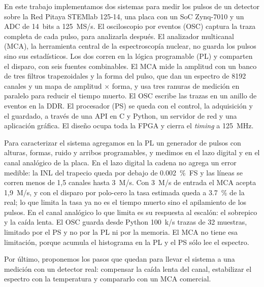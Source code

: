 \begin{resumen}%
En este trabajo implementamos dos sistemas para medir los pulsos de un detector
sobre la Red Pitaya STEMlab 125-14, una placa con un SoC Zynq-7010 y un ADC de
14~bits a 125~MS/s. El osciloscopio por eventos (OSC) captura la traza completa
de cada pulso, para analizarla después. El analizador multicanal (MCA), la
herramienta central de la espectroscopía nuclear, no guarda los pulsos sino sus
estadísticos. Los dos corren en la
lógica programable (PL) y comparten el disparo, con seis fuentes combinables.
El MCA mide la amplitud con un banco de tres filtros trapezoidales y la forma
del pulso, que dan un espectro de 8192 canales y un mapa de amplitud $\times$
forma, y usa tres ranuras de medición en paralelo para reducir el tiempo
muerto. El OSC escribe las trazas en un anillo de eventos en la DDR. El
procesador (PS) se queda con el control, la
adquisición y el guardado, a través de una API en C y Python, un servidor de red
y una aplicación gráfica. El diseño ocupa toda la FPGA y cierra el \emph{timing} a
\qty{125}{\mega\hertz}.

Para caracterizar el sistema agregamos en la PL un generador de pulsos con
alturas, formas, ruido y arribos programables, y medimos en el lazo digital y en
el canal analógico de la placa. En el lazo digital la cadena no agrega un error
medible: la INL del trapecio queda por debajo de \qty{0.002}{\percent}~FS y las
líneas se corren menos de 1,5 canales hasta 3~M/s. Con 3~M/s de entrada el MCA
acepta 1,9~M/s, y con el disparo por polo-cero la tasa estimada queda a
\qty{3.7}{\percent} de la real; lo que limita la tasa ya no es el tiempo muerto
sino el apilamiento de los pulsos. En el canal analógico lo que limita es su
respuesta al escalón: el sobrepico y la caída lenta. El OSC guarda desde Python
100~k/s trazas de 32 muestras, limitado por el PS y no por la PL ni por la
memoria. El MCA no tiene esa limitación, porque acumula el histograma en la PL y
el PS sólo lee el espectro.

Por último, proponemos los pasos que quedan para llevar el sistema a una
medición con un detector real: compensar la caída lenta del canal, estabilizar
el espectro con la temperatura y compararlo con un MCA comercial.
\end{resumen}



